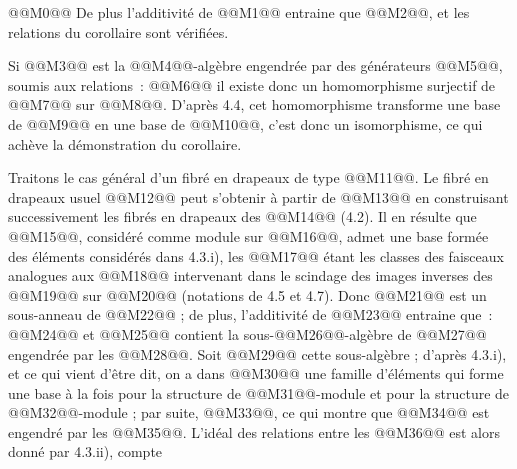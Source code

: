 
@@M0@@
De plus l'additivité de @@M1@@ entraine que @@M2@@, et les relations du corollaire sont vérifiées.

Si @@M3@@ est la @@M4@@-algèbre engendrée par des générateurs @@M5@@, soumis aux relations~:
@@M6@@
il existe donc un homomorphisme surjectif de @@M7@@ sur @@M8@@. D'après 4.4, cet homomorphisme transforme une base de @@M9@@ en une base de @@M10@@, c'est donc un isomorphisme, ce qui achève la démonstration du corollaire.

Traitons le cas général d'un fibré en drapeaux de type @@M11@@. Le fibré en drapeaux usuel @@M12@@ peut s'obtenir à partir de @@M13@@ en construisant successivement les fibrés en drapeaux des @@M14@@ (4.2). Il en résulte que @@M15@@, considéré comme module sur @@M16@@, admet une base formée des éléments considérés dans 4.3.i), les @@M17@@ étant les classes des faisceaux analogues aux @@M18@@ intervenant dans le scindage des images inverses des @@M19@@ sur @@M20@@ (notations de 4.5 et 4.7). Donc @@M21@@ est un sous-anneau de @@M22@@ ; de plus, l'additivité de @@M23@@ entraine que~:
@@M24@@
et @@M25@@ contient la sous-@@M26@@-algèbre de @@M27@@ engendrée par les @@M28@@. Soit @@M29@@ cette sous-algèbre ; d'après 4.3.i), et ce qui vient d'être dit, on a dans @@M30@@ une famille d'éléments qui forme une base à la fois pour la structure de @@M31@@-module et pour la structure de @@M32@@-module ; par suite, @@M33@@, ce qui montre que @@M34@@ est engendré par les @@M35@@. L'idéal des relations entre les @@M36@@ est alors donné par 4.3.ii), compte
